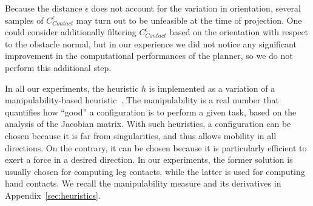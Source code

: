 \documentclass[journal]{IEEEtran}
\providecommand{\DIFaddtex}[1]{#1} %
\providecommand{\DIFdeltex}[1]{} %
\providecommand{\DIFaddbegin}{\protect\color{blue}} %
\providecommand{\DIFdelbegin}{\protect\cbdelete} %
\providecommand{\DIFdelend}{} %
\providecommand{\DIFadd}[1]{\texorpdfstring{\DIFaddtex{#1}}{#1}} %
\providecommand{\DIFdel}[1]{\texorpdfstring{\DIFdeltex{#1}}{}} %
\begin{document}
\DIFdelbegin \DIFdel{The reader is referred to our previous work for an extensive discussion on the benefits of this approach, }\DIFdelend %
\DIFaddbegin \DIFadd{Because the distance $\epsilon$ does not account for the variation in orientation, several samples of $ C_{Contact}^{\epsilon}$  may turn out to be unfeasible at the time of projection. One could consider additionally filtering $ C_{Contact}^{\epsilon}$ based on the orientation with respect to the obstacle normal, but in our experience we did not notice
any significant improvement in the computational performances of the planner, so we do not perform this additional step. 
 }

\DIFadd{In all our experiments, the heuristic $h$ is implemented as a variation of a manipulability-based heuristic~\cite{Yoshikawa1984}. The manipulability is a real number that quantifies how 
``good'' a configuration is to perform a given task, based on the analysis of the Jacobian matrix. With such heuristics, a configuration can be chosen because it is far from singularities, and thus allows mobility in all directions. On the contrary, it can be chosen because it is particularly efficient to exert a force in a desired direction. In our experiments, the former solution is usually chosen for computing leg contacts, while the latter is used for computing hand contacts. We recall the manipulability measure and its derivatives in Appendix~\ref{sec:heuristics}.
}
\end{document}
